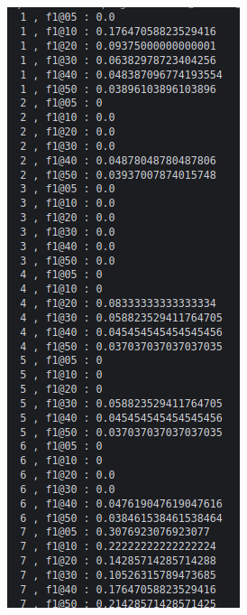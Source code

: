 \begin{figure}[H]
  \centering
  \captionsetup{justification=centering}

  \begin{subfigure}{0.22\textwidth}
  \includegraphics[width=\textwidth]{Sections/7Results/images/runexample5.png} 


\end{subfigure}
\end{figure}
